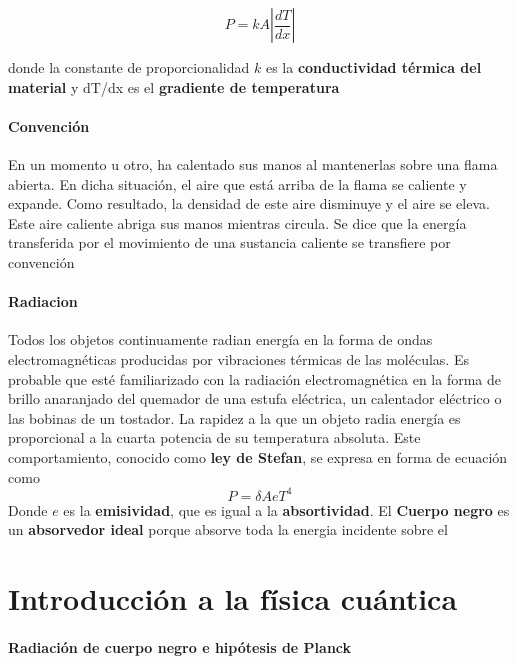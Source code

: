 \documentclass[10pt]{article}
\begin{document}
\begin{equation*}
	P = kA\left| \dfrac{dT}{dx} \right|
\end{equation*}

donde la constante de proporcionalidad $k$ es la \textbf{conductividad térmica del material} y dT/dx es el \textbf{gradiente de 
temperatura}

\paragraph{Convención}

En un momento u otro, ha calentado sus manos al mantenerlas sobre una flama abierta. En dicha situación, el aire que está arriba de la flama se caliente y expande. Como resultado, la densidad de este aire disminuye y el aire se eleva. Este aire caliente abriga sus manos mientras circula. Se dice que la energía transferida por el movimiento de una sustancia caliente se transfiere por convención

\paragraph{Radiacion}
Todos los objetos continuamente radian energía en la forma de ondas electromagnéticas producidas por vibraciones térmicas de las moléculas. Es probable que esté familiarizado con la radiación electromagnética en la forma de brillo anaranjado del
quemador de una estufa eléctrica, un calentador eléctrico o las bobinas de un tostador. La rapidez a la que un objeto radia energía es proporcional a la cuarta potencia de su temperatura absoluta. Este comportamiento, conocido como \textbf{ley de Stefan}, se expresa en forma de ecuación como
\begin{equation*}
	P = \delta A eT^4
\end{equation*}
Donde $e$ es la \textbf{emisividad}, que es igual a la \textbf{absortividad}. El \textbf{Cuerpo negro} es un \textbf{absorvedor ideal} porque absorve toda la energia incidente sobre el
\section{Introducción a la física cuántica}

\paragraph{Radiación de cuerpo negro e hipótesis de Planck}
\end{document}
